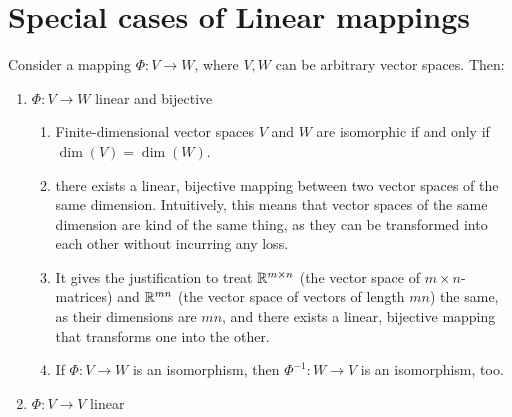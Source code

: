 \section{Special cases of Linear mappings}

Consider a mapping $\Phi : V \to W$, where $V, W$ can be arbitrary vector spaces.
Then:
\hfill \cite{mfml/book/mml/Deisenroth-Faisal-Ong}

\begin{enumerate}
    \item
    \begin{definition}[Isomorphism]
        $\Phi : V \to W$ linear and bijective
        \hfill \cite{mfml/book/mml/Deisenroth-Faisal-Ong}
    \end{definition}
    \begin{enumerate}
        \item
        \begin{theorem}
            Finite-dimensional vector spaces $V$ and $W$ are isomorphic if and only if $\dim(V ) = \dim(W)$.
            \hfill \cite{mfml/book/mml/Deisenroth-Faisal-Ong}
        \end{theorem}

        \item there exists a linear, bijective mapping between two vector spaces of the same dimension.
        Intuitively, this means that vector spaces of the same dimension are kind of the same thing, as they can be transformed into each other without incurring any loss.
        \hfill \cite{mfml/book/mml/Deisenroth-Faisal-Ong}

        \item It gives the justification to treat $\mathbb{R}^{m\times n}$ (the vector space of $m \times n$-matrices) and $\mathbb{R}^{mn}$ (the vector space of vectors of length $mn$) the same, as their dimensions are $mn$, and there exists a linear, bijective mapping that transforms one into the other.
        \hfill \cite{mfml/book/mml/Deisenroth-Faisal-Ong}

        \item If $\Phi : V \to W$ is an isomorphism, then $\Phi ^{-1} : W \to V$ is an isomorphism, too.
        \hfill \cite{mfml/book/mml/Deisenroth-Faisal-Ong}
    \end{enumerate}

    \item
    \begin{definition}[Endomorphism]
        $\Phi : V \to V$ linear
        \hfill \cite{mfml/book/mml/Deisenroth-Faisal-Ong}
    \end{definition}


\end{enumerate}
